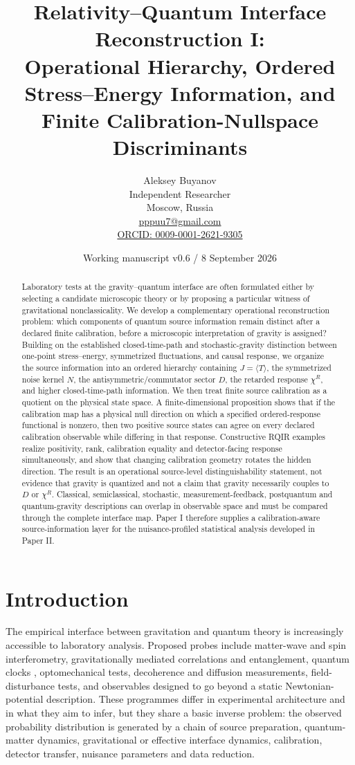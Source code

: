 \documentclass[11pt]{article}
\title{Relativity--Quantum Interface Reconstruction I:\\
Operational Hierarchy, Ordered Stress--Energy Information, and Finite Calibration-Nullspace Discriminants}
\author{Aleksey Buyanov\\
\small Independent Researcher\\
\small Moscow, Russia\\
\small \href{mailto:pppuu7@gmail.com}{pppuu7@gmail.com}\\
\small \href{https://orcid.org/0009-0001-2621-9305}{ORCID: 0009-0001-2621-9305}}
\date{Working manuscript v0.6 / 8 September 2026}
\begin{document}
\maketitle

\begin{abstract}
Laboratory tests at the gravity--quantum interface are often formulated either by selecting a candidate microscopic theory or by proposing a particular witness of gravitational nonclassicality. We develop a complementary operational reconstruction problem: which components of quantum source information remain distinct after a declared finite calibration, before a microscopic interpretation of gravity is assigned? Building on the established closed-time-path and stochastic-gravity distinction between one-point stress--energy, symmetrized fluctuations, and causal response, we organize the source information into an ordered hierarchy containing $J=\langle T\rangle$, the symmetrized noise kernel $N$, the antisymmetric/commutator sector $D$, the retarded response $\chi^R$, and higher closed-time-path information. We then treat finite source calibration as a quotient on the physical state space. A finite-dimensional proposition shows that if the calibration map has a physical null direction on which a specified ordered-response functional is nonzero, then two positive source states can agree on every declared calibration observable while differing in that response. Constructive RQIR examples realize positivity, rank, calibration equality and detector-facing response simultaneously, and show that changing calibration geometry rotates the hidden direction. The result is an operational source-level distinguishability statement, not evidence that gravity is quantized and not a claim that gravity necessarily couples to $D$ or $\chi^R$. Classical, semiclassical, stochastic, measurement-feedback, postquantum and quantum-gravity descriptions can overlap in observable space and must be compared through the complete interface map. Paper I therefore supplies a calibration-aware source-information layer for the nuisance-profiled statistical analysis developed in Paper II.
\end{abstract}

\section{Introduction}

The empirical interface between gravitation and quantum theory is increasingly accessible to laboratory analysis. Proposed probes include matter-wave and spin interferometry, gravitationally mediated correlations and entanglement, quantum clocks \cite{Roura2020,Wakakuwa2026}, optomechanical tests, decoherence and diffusion measurements, field-disturbance tests, and observables designed to go beyond a static Newtonian-potential description. These programmes differ in experimental architecture and in what they aim to infer, but they share a basic inverse problem: the observed probability distribution is generated by a chain of source preparation, quantum-matter dynamics, gravitational or effective interface dynamics, calibration, detector transfer, nuisance parameters and data reduction.
\end{document}
